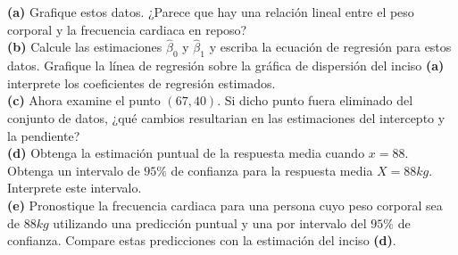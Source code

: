 \documentclass[10.5pt,notitlepage]{article}
\begin{document}
\noindent\textbf{(a)} Grafique estos datos. ¿Parece que hay una relación lineal entre el peso corporal y la frecuencia cardiaca en reposo?\\

\noindent\textbf{(b)} Calcule las estimaciones \(\hat{\beta}_0\) y \(\hat{\beta}_1\) y escriba la ecuación de regresión para estos datos. Grafique la línea de regresión sobre la gráfica de dispersión del inciso \textbf{(a)} interprete los coeficientes de regresión estimados. \\

\noindent\textbf{(c)} Ahora examine el punto \((67,40)\). Si dicho punto fuera eliminado del conjunto de datos, ¿qué cambios resultarian en las estimaciones del intercepto y la pendiente?\\

\noindent\textbf{(d)} Obtenga la estimación puntual de la respuesta media cuando \(x = 88\). Obtenga un intervalo de \(95\%\) de confianza para la respuesta media \(X = 88 kg\). Interprete este intervalo.\\

\noindent\textbf{(e)} Pronostique la frecuencia cardiaca para una persona cuyo peso corporal sea de \(88 kg\) utilizando una predicción puntual y una por intervalo del \(95\%\) de confianza. Compare estas predicciones con la estimación del inciso \textbf{(d)}. \\
\end{document}
